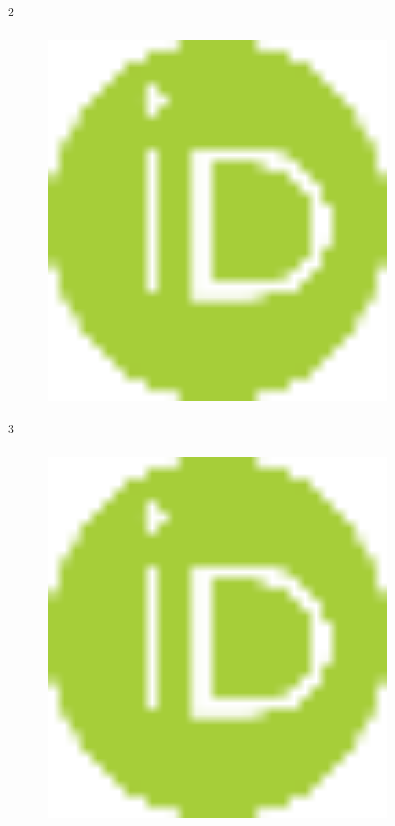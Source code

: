 \textsuperscript{2}
\begin{figure}[H]
	\centering
	\includegraphics[width=0.8\textwidth]{media/ict2/image2}
	\caption*{}
\end{figure}

\textsuperscript{3}
\begin{figure}[H]
	\centering
	\includegraphics[width=0.8\textwidth]{media/ict2/image2}
	\caption*{}
\end{figure}


